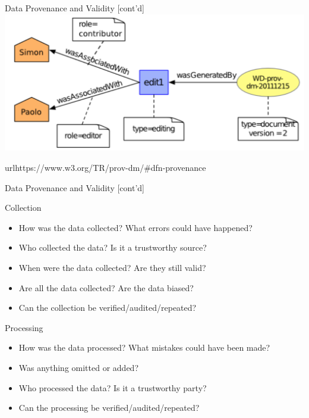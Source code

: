 \documentclass[ignorenonframetext,xcolor=x11names]{beamer}
\begin{document}
\begin{frame}{Data Provenance and Validity \small [cont'd]}
\centering
\includegraphics[width=.8\textwidth]{screen5.png}

\tiny{url{https://www.w3.org/TR/prov-dm/\#dfn-provenance}}
\end{frame}

\begin{frame}{Data Provenance and Validity \small [cont'd]}
\begin{block}{Collection}
\begin{itemize}
	\item How was the data collected? What errors could have happened?
	\item Who collected the data? Is it a trustworthy source?
	\item When were the data collected? Are they still valid?
	\item Are all the data collected? Are the data biased?
	\item Can the collection be verified/audited/repeated?
\end{itemize}
\end{block}

\begin{block}{Processing}
\begin{itemize}
	\item How was the data processed? What mistakes could have been made? 
	\item Was anything omitted or added?
	\item Who processed the data? Is it a trustworthy party?
	\item Can the processing be verified/audited/repeated?	
\end{itemize}
\end{block}
\end{frame}
\end{document}
